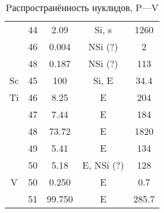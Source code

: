 \documentclass[a5paper,openany]{book}
\begin{document}
\begin{table}[h!]
{\begin{tabular}{ccccc}
			& 44 & 2.09 & Si, s & 1260 \\ [1mm] 			
			& 46 & 0.004 & NSi (?)  & 2\\ [1mm] 	
			& 48 & 0.187 & NSi (?)  & 113\\ [1mm] 	 
			Sc & 45 & 100 & Si, E  &  34.4 \\ [1mm]	
			Ti & 46 & 8.25 & E &  204 \\ [1mm]
			& 47 & 7.44 & E & 184 \\ [1mm] 			
			& 48 & 73.72 & E  & 1820 \\ [1mm] 
			& 49 & 5.41 & E & 134 \\ [1mm] 			
			& 50 & 5.18 & E, NSi (?) & 128 \\ [1mm] 
			V & 50 & 0.250 & E &  0.7 \\ [1mm]
			& 51 & 99.750 & E & 285.7 \\ [1mm] 	
			\hline 
		\end{tabular}
	}
	\caption{Pаспространённость нуклидов, P---V}
	\label{t:AbudanceSolarP-V}
\end{table}
\end{document}
